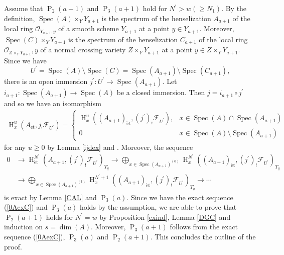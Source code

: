 \documentclass{article}
\newcommand{\spec}{\operatorname{Spec}}
\newcommand{\et}{\mathrm{\acute{e}t}}
\newcommand{\HO}{\operatorname{H}}
\begin{document}
 

Assume that $\operatorname{P}_{2}(a+1)$ and
$\operatorname{P}_{3}(a+1)$ hold for
$N^{\prime}>w (\geq N_{1})$. By the definition, 
$\spec(A)\times_{Y}Y_{a+1}$ is the spectrum of the henselization $A_{a+1}$
of the local ring $\mathcal{O}_{Y_{a+1}, y}$
of a smooth scheme $Y_{a+1}$ at a point $y\in Y_{a+1}$.
Moreover, 
$\spec(C)\times_{Y}Y_{a+1}$
is the spectrum of the henselization $C_{a+1}$
of the local ring
$\mathcal{O}_{Z\times_{Y}Y_{a+1}}, y$ of
a normal crossing variety $Z\times_{Y}Y_{a+1}$ at a point $y\in Z\times_{Y}Y_{a+1}$.
Since we have
%
\begin{equation*}
U^{\prime}
=
\spec(A)\setminus
\spec(C)
=
\spec(A_{a+1})\setminus
\spec(C_{a+1}),
\end{equation*}
%
there is an open immersion
$j^{\prime}: U^{\prime}\to \spec(A_{a+1})$.
Let $i_{a+1}: \spec(A_{a+1})\to \spec(A)$
be a closed immersion.
Then $j=i_{a+1}\circ j^{\prime}$ and so we have an
isomorphism
%
\begin{align*}
\HO^{u}_{x}(
A_{\et},
j_{!}\mathcal{F}_{U^{\prime}}
)
=
\left\{
%
\begin{array}{ll}
\HO^{u}_{x}(
(A_{a+1})_{\et},
(j^{\prime})_{!}\mathcal{F}_{U^{\prime}}
),  
&  x\in\spec(A)\cap\spec(A_{a+1})  
\\ [5pt]
0  &  x\in\spec(A)\setminus \spec(A_{a+1})
\end{array}
%
\right.
\end{align*}
%
for any $u\geq 0$ by Lemma \ref{ijdex} and \cite[Lemma 3.7]{Sak5}. 
Moreover, the sequence
%
\begin{align}\label{0AexC}
0
&\to
\HO^{N^{\prime}}_{\et}(A_{a+1}, (j^{\prime})_{!}\mathcal{F}_{U^{\prime}})_{T_{q}}
\to 
\displaystyle\bigoplus_{x\in\spec(A_{a+1})^{(0)}}
\HO^{N^{\prime}}_{x}(
(A_{a+1})_{\et},
(j^{\prime})_{!}\mathcal{F}_{U^{\prime}}
)_{T_{q}}  \nonumber
\\
&\to
\displaystyle\bigoplus_{x\in\spec(A_{a+1})^{(1)}}
\HO^{N^{\prime}+1}_{x}(
(A_{a+1})_{\et},
(j^{\prime})_{!}\mathcal{F}_{U^{\prime}}
)_{T_{q}}
\to
\cdots
\end{align}
%
is exact by Lemma \ref{CAL} and $\operatorname{P}_{3}(a)$.
Since we have the exact sequence (\ref{0AexC})
and $\operatorname{P}_{3}(a)$ holds
by the assumption,
we are able to prove that $\operatorname{P}_{2}(a+1)$
holds for $N^{\prime}=w$
by Proposition \ref{exind}, Lemma \ref{DGC}
and induction on $s=\operatorname{dim}(A)$.
Moreover, $\operatorname{P}_{3}(a+1)$
follows from the exact sequence (\ref{0AexC}),
$\operatorname{P}_{3}(a)$
and $\operatorname{P}_{2}(a+1)$.
This concludes the outline of the proof.
%
\end{document}
